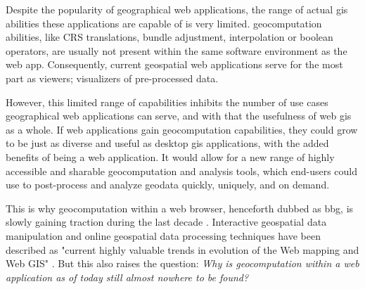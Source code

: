 Despite the popularity of geographical web applications, the range of actual \ac{gis} abilities these applications are capable of is very limited. \ac{geocomputation} abilities, like CRS translations, bundle adjustment, interpolation or boolean operators, are usually not present within the same software environment as the web app. Consequently, current geospatial web applications serve for the most part as viewers; visualizers of pre-processed data. 

However, this limited range of capabilities inhibits the number of use cases geographical web applications can serve, and with that the usefulness of web \ac{gis} as a whole.
If web applications gain \ac{geocomputation} capabilities, they could grow to be just as diverse and useful as desktop \ac{gis} applications, with the added benefits of being a web application. It would allow for a new range of highly accessible and sharable geocomputation and analysis tools, which end-users could use to post-process and analyze geodata quickly, uniquely, and on demand.

This is why \ac{geocomputation} within a web browser, henceforth dubbed as \ac{bbg}, is slowly gaining traction during the last decade \cite{kulawiak_analysis_2019, panidi_hybrid_2015, hamilton_client-side_2014}. 
Interactive geospatial data manipulation and online geospatial data processing techniques have been described as "current highly valuable trends in evolution of the Web mapping and Web GIS" \cite{panidi_hybrid_2015}. 
But this also raises the question: \textit{Why is geocomputation within a web application as of today still almost nowhere to be found?} 




